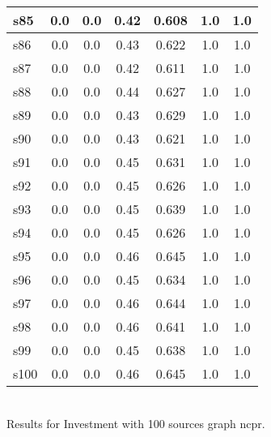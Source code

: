 \documentclass{article}
\begin{document}
\begin{tabular}{|l|c|c|c|c|c|c|}
\hline
s85 &0.0 & 0.0 & 0.42 & 0.608 & 1.0 & 1.0\\
\hline
s86 &0.0 & 0.0 & 0.43 & 0.622 & 1.0 & 1.0\\
\hline
s87 &0.0 & 0.0 & 0.42 & 0.611 & 1.0 & 1.0\\
\hline
s88 &0.0 & 0.0 & 0.44 & 0.627 & 1.0 & 1.0\\
\hline
s89 &0.0 & 0.0 & 0.43 & 0.629 & 1.0 & 1.0\\
\hline
s90 &0.0 & 0.0 & 0.43 & 0.621 & 1.0 & 1.0\\
\hline
s91 &0.0 & 0.0 & 0.45 & 0.631 & 1.0 & 1.0\\
\hline
s92 &0.0 & 0.0 & 0.45 & 0.626 & 1.0 & 1.0\\
\hline
s93 &0.0 & 0.0 & 0.45 & 0.639 & 1.0 & 1.0\\
\hline
s94 &0.0 & 0.0 & 0.45 & 0.626 & 1.0 & 1.0\\
\hline
s95 &0.0 & 0.0 & 0.46 & 0.645 & 1.0 & 1.0\\
\hline
s96 &0.0 & 0.0 & 0.45 & 0.634 & 1.0 & 1.0\\
\hline
s97 &0.0 & 0.0 & 0.46 & 0.644 & 1.0 & 1.0\\
\hline
s98 &0.0 & 0.0 & 0.46 & 0.641 & 1.0 & 1.0\\
\hline
s99 &0.0 & 0.0 & 0.45 & 0.638 & 1.0 & 1.0\\
\hline
s100 &0.0 & 0.0 & 0.46 & 0.645 & 1.0 & 1.0\\
\hline
\end{tabular}\\

\noindent Results for Investment with 100 sources graph ncpr.
\end{document}
